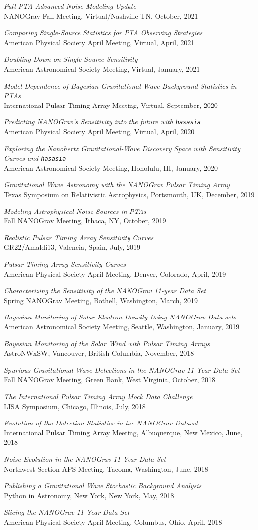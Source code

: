 \documentclass[11pt,letterpaper,sans,unicode]{moderncv}
\newcommand{\talkitem}[3]{\item \textit{#1}\\{#2}, #3} %
\begin{document}
\renewcommand\labelenumi{\bfseries\theenumi .}
\begin{etaremune}[leftmargin=8mm]
\small
\talkitem{Full PTA Advanced Noise Modeling Update}{NANOGrav Fall Meeting}{Virtual/Nashville TN, October, 2021}
\talkitem{Comparing Single-Source Statistics for PTA Observing Strategies}{American Physical Society April Meeting}{Virtual, April, 2021}
\talkitem{Doubling Down on Single Source Sensitivity}{American Astronomical Society Meeting}{Virtual, January, 2021}
\talkitem{Model Dependence of Bayesian Gravitational Wave Background Statistics in PTAs}{International Pulsar Timing Array Meeting}{Virtual, September, 2020}
\talkitem{Predicting NANOGrav's Sensitivity into the future with \texttt{hasasia}}{American Physical Society April Meeting}{Virtual, April, 2020}
\talkitem{Exploring the Nanohertz Gravitational-Wave Discovery Space with Sensitivity Curves and \texttt{hasasia}}{American Astronomical Society Meeting}{Honolulu, HI, January, 2020}
\talkitem{Gravitational Wave Astronomy with the NANOGrav Pulsar Timing Array}{Texas Symposium on Relativistic Astrophysics}{Portsmouth, UK, December, 2019}
\talkitem{Modeling Astrophysical Noise Sources in PTAs}{Fall NANOGrav Meeting}{Ithaca, NY, October, 2019}
\talkitem{Realistic Pulsar Timing Array Sensitivity Curves}{GR22/Amaldi13}{Valencia, Spain, July, 2019}
\talkitem{Pulsar Timing Array Sensitivity Curves}{American Physical Society April Meeting}{Denver, Colorado, April, 2019}
\talkitem{Characterizing the Sensitivity of the NANOGrav 11-year Data Set}{Spring NANOGrav Meeting} Bothell, Washington, March, 2019
\talkitem{Bayesian Monitoring of Solar Electron Density Using NANOGrav Data sets}{American Astronomical Society Meeting}{Seattle, Washington, January, 2019}
\talkitem{Bayesian Monitoring of the Solar Wind with Pulsar Timing Arrays}{AstroNWxSW}{Vancouver, British Columbia, November, 2018}
\talkitem{Spurious Gravitational Wave Detections in the NANOGrav 11 Year Data Set}{Fall NANOGrav Meeting}{Green Bank, West Virginia, October, 2018}
\talkitem{The International Pulsar Timing Array Mock Data Challenge}{LISA Symposium} Chicago, Illinois, July, 2018
\talkitem{Evolution of the Detection Statistics in the NANOGrav Dataset}{International Pulsar Timing Array Meeting}{Albuquerque, New Mexico, June, 2018}
\talkitem{Noise Evolution in the NANOGrav 11 Year Data Set}{Northwest Section APS Meeting}{Tacoma, Washington, June, 2018}
\talkitem{Publishing a Gravitational Wave Stochastic Background Analysis}{Python in Astronomy}{New York, New York, May, 2018}
\talkitem{Slicing the NANOGrav 11 Year Data Set}{American Physical Society April Meeting}{Columbus, Ohio, April, 2018}

\end{etaremune}
\end{document}

